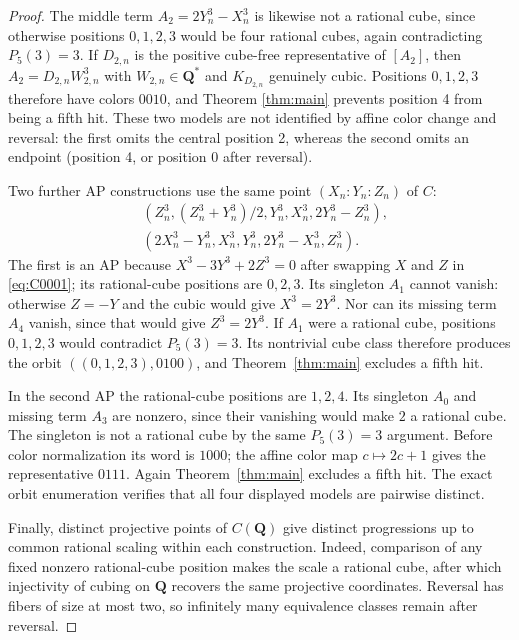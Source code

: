 \documentclass[10pt]{article}
\newcommand{\Q}{\mathbf Q}
\begin{document}
\begin{proof}
The middle term $A_2=2Y_n^3-X_n^3$ is likewise not a rational cube, since
otherwise positions $0,1,2,3$ would be four rational cubes, again
contradicting $P_5(3)=3$.  If $D_{2,n}$ is the positive cube-free
representative of $[A_2]$, then
$A_2=D_{2,n}W_{2,n}^3$ with $W_{2,n}\in\Q^*$ and $K_{D_{2,n}}$ genuinely
cubic.  Positions $0,1,2,3$ therefore have colors $0010$, and Theorem
\ref{thm:main} prevents position 4 from being a fifth hit.  These two models
are not identified by affine color change and reversal: the first omits the
central position 2, whereas the second omits an endpoint (position 4, or
position 0 after reversal).

Two further AP constructions use the same point $(X_n:Y_n:Z_n)$ of $C$:
\begin{align}
 &(Z_n^3,(Z_n^3+Y_n^3)/2,Y_n^3,X_n^3,2Y_n^3-Z_n^3),
 \label{eq:AP0100}\\
 &(2X_n^3-Y_n^3,X_n^3,Y_n^3,2Y_n^3-X_n^3,Z_n^3).
 \label{eq:AP0111}
\end{align}
The first is an AP because $X^3-3Y^3+2Z^3=0$ after swapping $X$ and
$Z$ in \eqref{eq:C0001}; its rational-cube positions are $0,2,3$.
Its singleton $A_1$ cannot vanish: otherwise $Z=-Y$ and the cubic would
give $X^3=2Y^3$.  Nor can its missing term $A_4$ vanish, since that would
give $Z^3=2Y^3$.  If $A_1$ were a rational cube, positions $0,1,2,3$
would contradict $P_5(3)=3$.  Its nontrivial cube class therefore produces
the orbit $((0,1,2,3),0100)$, and Theorem~\ref{thm:main} excludes a fifth
hit.

In the second AP the rational-cube positions are $1,2,4$.  Its singleton
$A_0$ and missing term $A_3$ are nonzero, since their vanishing would make
$2$ a rational cube.  The singleton is not a rational cube by the same
$P_5(3)=3$ argument.  Before color normalization its word is $1000$; the
affine color map $c\mapsto2c+1$ gives the representative $0111$.
Again Theorem~\ref{thm:main} excludes a fifth hit.  The exact orbit
enumeration verifies that all four displayed models are pairwise distinct.

Finally, distinct projective points of $C(\Q)$ give distinct progressions up
to common rational scaling within each construction.  Indeed, comparison of
any fixed nonzero rational-cube position makes the scale a rational cube,
after which injectivity of cubing on $\Q$ recovers the same projective
coordinates.  Reversal has fibers of size at most two, so infinitely many
equivalence classes remain after reversal.
\end{proof}
\end{document}
